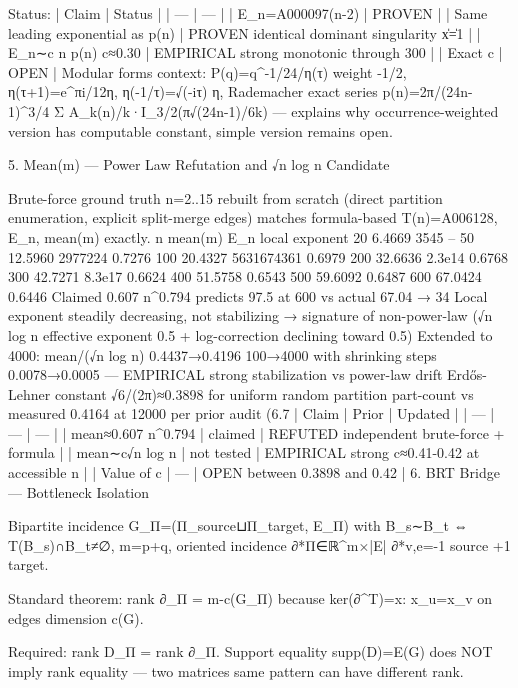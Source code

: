 Status:
| Claim | Status |
| --- | --- |
| E_n=A000097(n-2) | PROVEN |
| Same leading exponential as p(n) | PROVEN identical dominant singularity \|x\|=1 |
| E_n∼c n p(n) c≈0.30 | EMPIRICAL strong monotonic through 300 |
| Exact c | OPEN |
Modular forms context: P(q)=q^{-1/24}/η(τ) weight -1/2, η(τ+1)=e^{πi/12}η, η(-1/τ)=√(-iτ) η, Rademacher exact series p(n)=2π/(24n-1)^{3/4} Σ A_k(n)/k·I_{3/2}(π√(24n-1)/6k) — explains why occurrence-weighted version has computable constant, simple version remains open.

5. Mean(m) — Power Law Refutation and √n log n Candidate

Brute-force ground truth n=2..15 rebuilt from scratch (direct partition enumeration, explicit split-merge edges) matches formula-based T(n)=A006128, E_n, mean(m) exactly.
n  mean(m)  E_n          local exponent
20 6.4669   3545         --
50 12.5960  2977224      0.7276
100 20.4327 5631674361   0.6979
200 32.6636 2.3e14       0.6768
300 42.7271 8.3e17       0.6624
400 51.5758              0.6543
500 59.6092              0.6487
600 67.0424              0.6446
Claimed 0.607 n^0.794 predicts 97.5 at 600 vs actual 67.04 → 34%
Local exponent steadily decreasing, not stabilizing → signature of non-power-law (√n log n effective exponent 0.5 + log-correction declining toward 0.5)
Extended to 4000: mean/(√n log n) 0.4437→0.4196 100→4000 with shrinking steps 0.0078→0.0005 — EMPIRICAL strong stabilization vs power-law drift
Erdős-Lehner constant √6/(2π)≈0.3898 for uniform random partition part-count vs measured 0.4164 at 12000 per prior audit (6.7%
| Claim | Prior | Updated |
| --- | --- | --- |
| mean≈0.607 n^0.794 | claimed | REFUTED independent brute-force + formula |
| mean∼c√n log n | not tested | EMPIRICAL strong c≈0.41-0.42 at accessible n |
| Value of c | — | OPEN between 0.3898 and 0.42 |
6. BRT Bridge — Bottleneck Isolation

Bipartite incidence G_Π=(Π_source⊔Π_target, E_Π) with B_s∼B_t ⇔ T(B_s)∩B_t≠∅, m=p+q, oriented incidence ∂*Π∈ℝ^{m×|E|} ∂*{v,e}=-1 source +1 target.

Standard theorem: rank ∂_Π = m-c(G_Π) because ker(∂^T)={x: x_u=x_v on edges} dimension c(G).

Required: rank D_Π = rank ∂_Π. Support equality supp(D)=E(G) does NOT imply rank equality — two matrices same pattern can have different rank.


